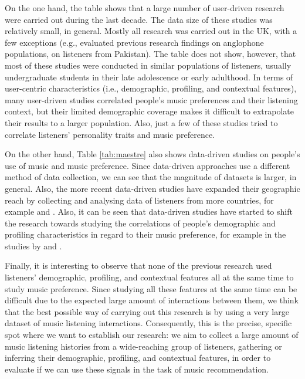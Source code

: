 On the one hand, the table shows that a large number of user-driven research were carried out during the last decade. The data size of these studies was relatively small, in general. Mostly all research was carried out in the UK, with a few exceptions (e.g., \textcite{rana07role} evaluated previous research findings on anglophone populations, on listeners from Pakistan). The table does not show, however, that most of these studies were conducted in similar populations of listeners, usually undergraduate students in their late adolescence or early adulthood. 
In terms of user-centric characteristics (i.e., demographic, profiling, and contextual features), many user-driven studies correlated people's music preferences and their listening context, but their limited demographic coverage makes it difficult to extrapolate their results to a larger population. Also, just a few of these studies tried to correlate listeners' personality traits and music preference.




On the other hand, Table \ref{tab:maestre} also shows data-driven studies on people's use of music and music preference. Since data-driven approaches use a different method of data collection, we can see that the magnitude of datasets is larger, in general. Also, the more recent data-driven studies have expanded their geographic reach by collecting and analysing data of listeners from more countries, for example \textcite{schedl15tailoring} and \textcite{schedl15influence}. Also, it can be seen that data-driven studies have started to shift the research towards studying the correlations of people's demographic and profiling characteristics in regard to their music preference, for example in the studies by \textcite{baur11thesis} and \textcite{baur12listening}.

Finally, it is interesting to observe that none of the previous research used listeners' demographic, profiling, and contextual features all at the same time to study music preference. 
Since studying all these features at the same time can be difficult due to the expected large amount of interactions between them, we think that the best possible way of carrying out this  research is by using a very large dataset of music listening interactions. Consequently, this is the precise, specific spot where we want to establish our research: we aim to collect a large amount of music listening histories from a wide-reaching group of listeners, gathering or inferring their demographic, profiling, and contextual features, in order to evaluate if we can use these signals in the task of music recommendation.




